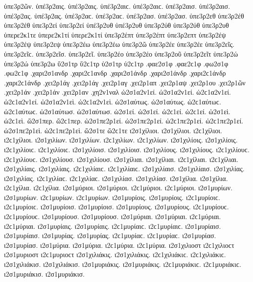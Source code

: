 {ὑπε3ρ2ῶν.
ὑπέ3ρ2αις. ὑπέ3ρ2αις. ὑπέ3ρ2αιϲ. ὑπέ3ρ2αιϲ.
ὑπέ3ρ2αισ. ὑπέ3ρ2αισ.
ὑπέ3ρ2ας. ὑπέ3ρ2ας. ὑπέ3ρ2αϲ. ὑπέ3ρ2αϲ.
ὑπέ3ρ2ασ. ὑπέ3ρ2ασ.
ὑπε3ρ2εθ   %
ὑπε3ρ2έθ ὑπε3ρ2έθ
ὑπε3ρ2εί ὑπε3ρ2εί   %
ὑπέ3ρ2υθ ὑπέ3ρ2υθ   %
ὑπε3ρ2ύθ ὑπε3ρ2ύθ
ὑπε3ρ2υθ   %
ὑπερε2κ1τε   %
ὑπερε2κ1τί ὑπερε2κ1τί   %
ὑπε3ρ2έπτ ὑπε3ρ2έπτ   %
ὑπε3ρ2επτ
ὑπε3ρ2έψ ὑπε3ρ2έψ
ὑπε3ρ2εψ
ὑπε3ρ2έω ὑπε3ρ2έω   %
ὑπε3ρ2ῶ
ὑπε3ρ2έε ὑπε3ρ2έε
ὑπε3ρ2εῖς. ὑπε3ρ2εῖϲ.
ὑπε3ρ2εῖσ.
ὑπε3ρ2εῖ.
ὑπε3ρ2έο ὑπε3ρ2έο
ὑπε3ρ2οῦ
ὑπε3ρ2εῖτ
ὑπε3ρ2ώ ὑπε3ρ2ώ   %
ὑπε3ρ2ω   %
ὕ2σ1τρ ὕ2ϲ1τρ   %
ὑ2σ1τρ ὑ2ϲ1τρ   %
.φαε2σ1φ .φαε2ϲ1φ   %
.φω2σ1φ .φω2ϲ1φ   %
.χαρι2σ1ανδρ .χαρι2ϲ1ανδρ   %
.χαρι2σ1άνδρ .χαρι2σ1άνδρ .χαρι2ϲ1άνδρ .χαρι2ϲ1άνδρ
.χει2ρ1άγ .χει2ρ1άγ   %
.χει2ρ1αγ   %
.χει2ρ1απ   %
.χει2ρ1αψ   %
.χει2ρ1ου   %
.χει2ρ1ῶν   %
.χει2ρ1άν .χει2ρ1άν
.χει2ρ1αν
.χη2ν1ναλ   %
ὡ2σ1α2ν1εί. ὡ2σ1α2ν1εί. ὡ2ϲ1α2ν1εί. ὡ2ϲ1α2ν1εί.   %
ὡ2σ1α2ν1εὶ. ὡ2ϲ1α2ν1εὶ.
ὡ2σ1αύτως. ὡ2σ1αύτως. ὡ2ϲ1αύτωϲ. ὡ2ϲ1αύτωϲ.   %
ὡ2σ1αύτωσ. ὡ2σ1αύτωσ.
ὡ2σ1εί. ὡ2σ1εί. ὡ2ϲ1εί. ὡ2ϲ1εί.   %
ὡ2σ1εὶ. ὡ2ϲ1εὶ.
ὥ2σ1περ. ὥ2ϲ1περ.   %
ὡ2σ1πε2ρ1εί. ὡ2σ1πε2ρ1εί. ὡ2ϲ1πε2ρ1εί. ὡ2ϲ1πε2ρ1εί.   %
ὡ2σ1πε2ρ1εὶ. ὡ2ϲ1πε2ρ1εὶ.
ὥ2σ1τε ὥ2ϲ1τε   %
ι2σ1χίλιοι. ι2σ1χίλιοι. ι2ϲ1χίλιοι. ι2ϲ1χίλιοι.   %
ι2σ1χιλίων. ι2σ1χιλίων. ι2ϲ1χιλίων. ι2ϲ1χιλίων.
ι2σ1χιλίοις. ι2σ1χιλίοις. ι2ϲ1χιλίοιϲ. ι2ϲ1χιλίοιϲ.
ι2σ1χιλίοισ. ι2σ1χιλίοισ.
ι2σ1χιλίους. ι2σ1χιλίους. ι2ϲ1χιλίουϲ. ι2ϲ1χιλίουϲ.
ι2σ1χιλίουσ. ι2σ1χιλίουσ.
ι2σ1χίλιαι. ι2σ1χίλιαι. ι2ϲ1χίλιαι. ι2ϲ1χίλιαι.
ι2σ1χιλίαις. ι2σ1χιλίαις. ι2ϲ1χιλίαιϲ. ι2ϲ1χιλίαιϲ.
ι2σ1χιλίαισ. ι2σ1χιλίαισ.
ι2σ1χιλίας. ι2σ1χιλίας. ι2ϲ1χιλίαϲ. ι2ϲ1χιλίαϲ.
ι2σ1χιλίασ. ι2σ1χιλίασ.
ι2σ1χίλια. ι2σ1χίλια. ι2ϲ1χίλια. ι2ϲ1χίλια.
%
ι2σ1μύριοι. ι2σ1μύριοι. ι2ϲ1μύριοι. ι2ϲ1μύριοι.   %
ι2σ1μυρίων. ι2σ1μυρίων. ι2ϲ1μυρίων. ι2ϲ1μυρίων.
ι2σ1μυρίοις. ι2σ1μυρίοις. ι2ϲ1μυρίοιϲ. ι2ϲ1μυρίοιϲ.
ι2σ1μυρίοισ. ι2σ1μυρίοισ.
ι2σ1μυρίους. ι2σ1μυρίους. ι2ϲ1μυρίουϲ. ι2ϲ1μυρίουϲ.
ι2σ1μυρίουσ. ι2σ1μυρίουσ.
ι2σ1μύριαι. ι2σ1μύριαι. ι2ϲ1μύριαι. ι2ϲ1μύριαι.
ι2σ1μυρίαις. ι2σ1μυρίαις. ι2ϲ1μυρίαιϲ. ι2ϲ1μυρίαιϲ.
ι2σ1μυρίαισ. ι2σ1μυρίαισ.
ι2σ1μυρίας. ι2σ1μυρίας. ι2ϲ1μυρίαϲ. ι2ϲ1μυρίαϲ.
ι2σ1μυρίασ. ι2σ1μυρίασ.
ι2σ1μύρια. ι2σ1μύρια. ι2ϲ1μύρια. ι2ϲ1μύρια.
%
ι2σ1χιλιοστ ι2ϲ1χιλιοϲτ   %
%
ι2σ1μυριοστ ι2ϲ1μυριοϲτ   %
%
ι2σ1χιλιάκις. ι2σ1χιλιάκις. ι2ϲ1χιλιάκιϲ. ι2ϲ1χιλιάκιϲ.   %
ι2σ1χιλιάκισ. ι2σ1χιλιάκισ.
%
ι2σ1μυριάκις. ι2σ1μυριάκις. ι2ϲ1μυριάκιϲ. ι2ϲ1μυριάκιϲ.   %
ι2σ1μυριάκισ. ι2σ1μυριάκισ.
}

